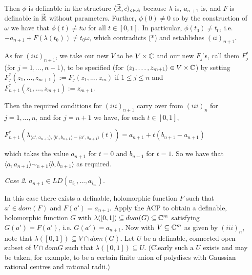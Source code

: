 \documentclass[12pt,nodate]{article}
\begin{document}
Then $\phi$ is definable in the structure $\langle \widetilde{\mathbb{R}}, c \rangle_{c \in A}$ because $\lambda$ is, $a_{n+1}$ is, and $F$ is definable in $\widetilde{\mathbb{R}}$ without parameters. Further, $\phi (0) \neq 0$ so by the construction of $\omega$ we have that $\phi (t) \neq t\omega $ for all $t \in [0, 1]$. In particular, $\phi (t_0 ) \neq t_0$, i.e. $-a_{n+1} + F(\lambda (t_0 )) \neq t_0 \omega$, which contradicts (*) and establishes $(ii)_{n+1}$.

\vspace{2mm}
 
 As for $(iii)_{n+1}$, we take our new $V$ to be $V \times \mathbb{C}$ and our new $F_j$'s, call them $F^{*}_j$ (for $j = 1, \ldots , n+1$), to be specified  (for $\langle z_1 , \ldots , z_{m+1} \rangle \in V \times \mathbb{C}$) by setting $F_j^{*} (z_1 , \ldots , z_{m+1}) := F_j (z_1 , \ldots , z_{m})$ if $1 \leq j \leq n$ and $F_{n+1}^{*} (z_1 , \ldots , z_{m+1}) := z_{m+1}$.

Then the required conditions for $(iii)_{n+1}$ carry over from $(iii)_n$ for 
$j = 1, \ldots , n$, and for $j=n+1$ we have, for each $t \in [0, 1]$,

\vspace{3mm}

\hspace{4mm} $F_{n+1}^{*} (\lambda _{\langle a' , a_{n+1} \rangle, \langle b' , b_{n+1}   \rangle - \langle a' , a_{n+1} \rangle} (t)) = a_{n+1} + t(b_{n+1} - a_{n+1})$
 

 \vspace{3mm}

 \noindent
which takes the value $a_{n+1}$ for $t=0$ and $b_{n+1}$ for $t=1$. So we have that $\langle a, a_{n+1} \rangle \sim_{n+1} \langle b, b_{n+1} \rangle$ as required.
 
 \vspace{3mm}

 \noindent
 \emph{Case 2}. $a_{n+1} \in LD(a_{i_1} , \ldots , a_{i_m})$. 

\vspace{2mm}
In this case there exists a definable, holomorphic function $F$ such that $a' \in dom(F)$ and $F(a') = a_{n+1}$. Apply the ACP to obtain a definable, holomorphic function $G$ with $\lambda ([0, 1]) \subseteq dom(G) \subseteq \mathbb{C}^m$ satisfying $G(a') = F(a')$, i.e. $G(a') = a_{n+1}$. Now with $V \subseteq \mathbb{C}^m$ as given by $(iii)_{n}$, note that  $\lambda ([0, 1]) \subseteq V \cap dom(G)$. Let $U$ be a definable, connected open subset of $V \cap dom{G}$ such that $\lambda ([0, 1]) \subseteq U$. (Clearly such a $U$ exists and may be taken, for example, to be a certain finite union of polydiscs with Gaussian rational centres and rational radii.) 
\end{document}
